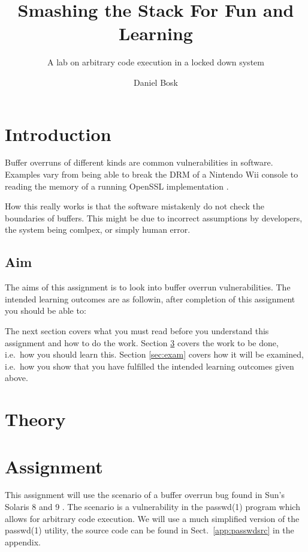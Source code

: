 \title{Smashing the Stack For Fun and Learning}
\subtitle{A lab on arbitrary code execution in a locked down system}

\author{%
  Daniel Bosk
}

\maketitle


\section{Introduction}
\label{sec:intro}
Buffer overruns of different kinds are common vulnerabilities in software.
Examples vary from being able to break the DRM of a Nintendo Wii console 
\cite{twilighthack} to reading the memory of a running OpenSSL implementation 
\cite{heartbleed}.

How this really works is that the software mistakenly do not check the 
boundaries of buffers.
This might be due to incorrect assumptions by developers, the system being 
comlpex, or simply human error.

\subsection{Aim}
\label{sec:aim}
The aims of this assignment is to look into buffer overrun vulnerabilities.
The intended learning outcomes are as followin, after completion of this 
assignment you should be able to:
\begin{itemize}
  
\end{itemize}

The next section covers what you must read before you understand this 
assignment and how to do the work.
Section \ref{sec:tasks} covers the work to be done, i.e.~how you should learn 
this.
Section \ref{sec:exam} covers how it will be examined, i.e.~how you show that 
you have fulfilled the intended learning outcomes given above.


\section{Theory}
\label{sec:reading}



\section{Assignment}
\label{sec:tasks}
This assignment will use the scenario of a buffer overrun bug found in Sun's 
Solaris 8 and 9 \cite{passwdbug}.
The scenario is a vulnerability in the passwd(1) program which allows for 
arbitrary code execution.
We will use a much simplified version of the passwd(1) utility, the source code 
can be found in Sect.~\ref{app:passwdsrc} in the appendix.


